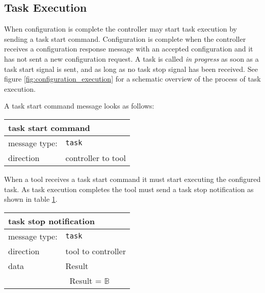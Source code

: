 \documentclass{article}
\newcommand{\msg}[1]{\texttt{#1}}
\begin{document}
  \subsection{Task Execution} \label{ss::task_execution}

   When configuration is complete the controller may start task execution by
   sending a task start command. Configuration is complete when the controller
   receives a configuration response message with an accepted configuration and
   it has not sent a new configuration request.  A task is called \textit{in
   progress} as soon as a task start signal is sent, and as long as no task
   stop signal has been received. See figure \ref{fig:configuration_execution}
   for a schematic overview of the process of task execution.

   A task start command message looks as follows:

   \begin{table}[H]
    \begin{center}
     \begin{tabular}{|ll|}
      \hline
       \multicolumn{2}{|l|}{\textbf{task start command}} \\
      \hline
       message type:   & \msg{task} \\
      \hline
       direction       & controller to tool \\
      \hline
     \end{tabular}
    \end{center}
    \vspace{-0.3cm}
   \end{table}

   \noindent When a tool receives a task start command it must start executing
   the configured task. As task execution completes the tool must send a task stop
   notification as shown in table \ref{table:task_stop}.

   \begin{table}[H]
    \begin{center}
     \begin{tabular}{|ll|}
      \hline
       \multicolumn{2}{|l|}{\textbf{task stop notification}} \\
      \hline
       message type:   & \msg{task} \\
      \hline
       direction       & tool to controller \\
       data            & Result \\
                       & \ Result = $\mathbb{B}$ \\
      \hline
     \end{tabular}
     \label{table:task_stop}
    \end{center}
    \vspace{-0.3cm}
   \end{table}
\end{document}
